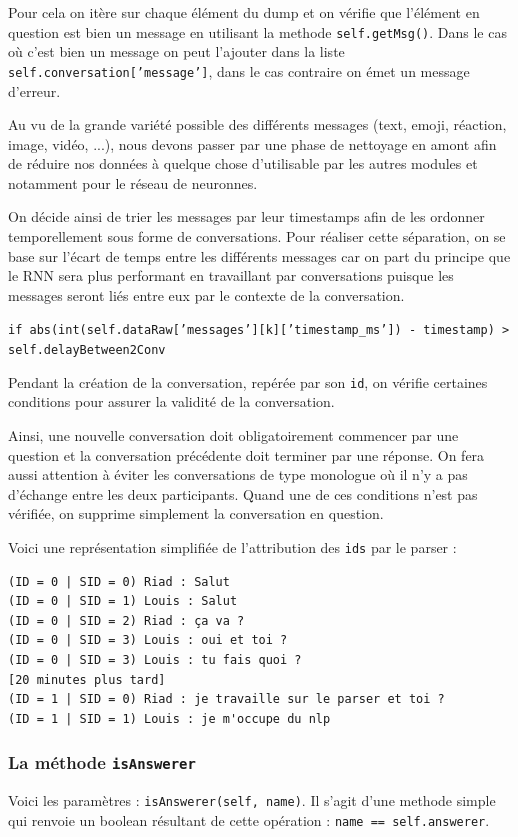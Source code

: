 \documentclass[10pt,a4paper]{article}
\begin{document}
Pour cela on itère sur chaque élément du dump et on vérifie que l'élément en question est bien un message en utilisant la methode \texttt{self.getMsg()}. Dans le cas où c'est bien un message on peut l'ajouter dans la liste \texttt{self.conversation['message']}, dans le cas contraire on émet un message d'erreur.

Au vu de la grande variété possible des différents messages (text, emoji, réaction, image, vidéo, ...), nous devons passer par une phase de nettoyage en amont afin de réduire nos données à quelque chose d'utilisable par les autres modules et notamment pour le réseau de neuronnes.

On décide ainsi de trier les messages par leur timestamps afin de les ordonner temporellement sous forme de conversations. Pour réaliser cette séparation, on se base sur l'écart de temps entre les différents messages car on part du principe que le RNN sera plus performant en travaillant par conversations puisque les messages seront liés entre eux par le contexte de la conversation.

\begin{center}
    \texttt{if abs(int(self.dataRaw['messages'][k]['timestamp\_ms']) - timestamp) > self.delayBetween2Conv}
\end{center}

Pendant la création de la conversation, repérée par son \texttt{id}, on vérifie certaines conditions pour assurer la validité de la conversation. 

Ainsi, une nouvelle conversation doit obligatoirement commencer par une question et la conversation précédente doit terminer par une réponse. On fera aussi attention à éviter les conversations de type monologue où il n'y a pas d'échange entre les deux participants. Quand une de ces conditions n'est pas vérifiée, on supprime simplement la conversation en question.

Voici une représentation simplifiée de l'attribution des \texttt{ids} par le parser :

\begin{verbatim}
(ID = 0 | SID = 0) Riad : Salut
(ID = 0 | SID = 1) Louis : Salut
(ID = 0 | SID = 2) Riad : ça va ?
(ID = 0 | SID = 3) Louis : oui et toi ?
(ID = 0 | SID = 3) Louis : tu fais quoi ?
[20 minutes plus tard]
(ID = 1 | SID = 0) Riad : je travaille sur le parser et toi ?
(ID = 1 | SID = 1) Louis : je m'occupe du nlp
\end{verbatim}

\subsubsection{La méthode \texttt{isAnswerer}}
Voici les paramètres : \texttt{isAnswerer(self, name)}. Il s'agit d'une methode simple qui renvoie un boolean résultant de cette opération : \texttt{name == self.answerer}.
\end{document}
